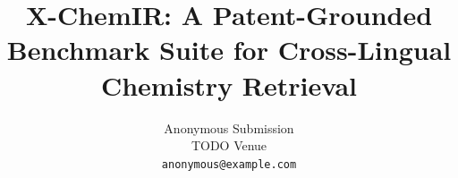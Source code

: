 \documentclass[11pt]{article}
\title{X-ChemIR: A Patent-Grounded Benchmark Suite for Cross-Lingual Chemistry Retrieval}
\author{Anonymous Submission \\
  TODO Venue \\
  \texttt{anonymous@example.com}}
\begin{document}
\maketitle


% 
% 







\clearpage


\clearpage 
\appendix %
\setcounter{figure}{0} \setcounter{table}{0} \renewcommand{\thefigure}{S.\arabic{figure}} \renewcommand{\thetable}{S.\arabic{table}} %
\renewcommand{\theHfigure}{supp.\arabic{figure}} \renewcommand{\theHtable}{supp.\arabic{table}}

\end{document}
